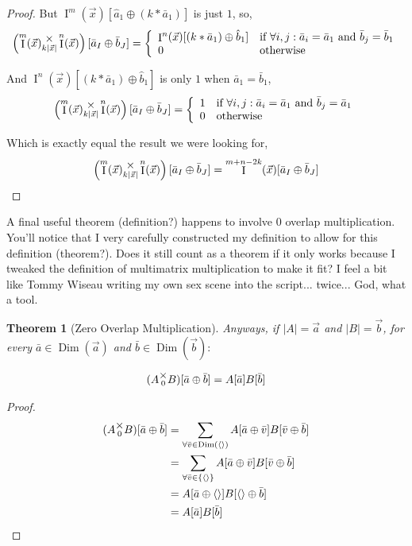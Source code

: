 \documentclass[12pt]{book}
\theoremstyle{plain}
\newtheorem{theorem}{Theorem}[chapter]
\theoremstyle{definition}
\theoremstyle{ppart}
\theoremstyle{case}
\theoremstyle{solution}
\DeclareMathOperator{\Dim}{Dim}
\DeclareMathOperator{\Ident}{I}
\newcommand{\mmult}[1]{\text{\raisebox{1ex}{$\underset{#1}{\times}$}}}
\newcommand{\shape}[1]{\left|#1\right|}
\begin{document}
\begin{landscape}
\begin{proof}
But $\Ident^m(\vec{x}) [\hat{a}_1 \oplus (k * \bar{a}_1)]$ is just $1$, so,
\[
\left( \Ident^m(\vec{x}) \mmult{k\shape{\vec{x}}} \Ident^n(\vec{x}) \right)
[\bar{a}_I \oplus \bar{b}_J] =
\left\{
  \begin{array}{ll}
    \Ident^n(\vec{x}) [(k * \bar{a}_1) \oplus \hat{b}_1]
    & \mbox{if } \forall i, j : \bar{a}_i = \bar{a}_1 \mbox{ and } \bar{b}_j = \bar{b}_1 \\
    0 & \mbox{otherwise}
  \end{array}
\right.
\]

And $\Ident^n(\vec{x}) [(k * \bar{a}_1) \oplus \hat{b}_1]$ is only $1$ when $\bar{a}_1 = \bar{b}_1$,
\[
\left( \Ident^m(\vec{x}) \mmult{k\shape{\vec{x}}} \Ident^n(\vec{x}) \right)
[\bar{a}_I \oplus \bar{b}_J] =
\left\{
  \begin{array}{ll}
    1 & \mbox{if } \forall i, j : \bar{a}_i = \bar{a}_1 \mbox{ and } \bar{b}_j = \bar{a}_1 \\
    0 & \mbox{otherwise}
  \end{array}
\right.
\]

Which is exactly equal the result we were looking for,
\[
  \left( \Ident^m(\vec{x}) \mmult{k\shape{\vec{x}}} \Ident^n(\vec{x}) \right) [\bar{a}_I \oplus \bar{b}_J]
  = \Ident^{m+n-2k}(\vec{x}) [\bar{a}_I \oplus \bar{b}_J]
\]
\end{proof}
\end{landscape}


A final useful theorem (definition?) happens to involve 0 overlap multiplication.
You'll notice that I very carefully constructed my definition to allow for this
definition (theorem?). Does it still count as a theorem if it only works because
I tweaked the definition of multimatrix multiplication to make it fit? I feel
a bit like Tommy Wiseau writing my own sex scene into the script... twice... God,
what a tool.

\begin{theorem}[Zero Overlap Multiplication]
Anyways, if $\shape{A} = \vec{a}$ and $\shape{B} = \vec{b}$, for every $\bar{a} \in \Dim(\vec{a})$
and $\bar{b} \in \Dim(\vec{b}):$

\[ (A \mmult{0} B)[\bar{a} \oplus \bar{b}] = A[\bar{a}] B[\bar{b}] \]

\end{theorem}
\begin{proof}
\begin{align*}
	(A \mmult{0} B)[\bar{a} \oplus \bar{b}]
	&=
	\sum_{\forall \bar{v} \in \Dim(\left<\right>)}
	A[\bar{a} \oplus \bar{v}] B[\bar{v} \oplus \bar{b}] \\
	&=
	\sum_{\forall \bar{v} \in \left\{\left<\right>\right\}}
	A[\bar{a} \oplus \bar{v}] B[\bar{v} \oplus \bar{b}] \\
	&=
	A[\bar{a} \oplus \left<\right>] B[\left<\right> \oplus \bar{b}] \\
	&=
	A[\bar{a}] B[\bar{b}] \\
\end{align*}
\end{proof}
\end{document}

